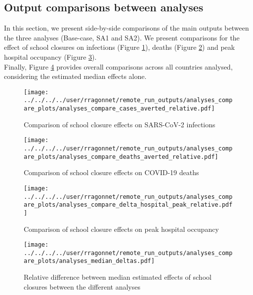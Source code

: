 \subsection{Output comparisons between analyses}
In this section, we present side-by-side comparisons of the main outputs between the three analyses (Base-case, SA1 and SA2). 
We present comparisons for the effect of school closures on infections (Figure \ref{fig:compare_infections}), deaths (Figure \ref{fig:compare_deaths}) and peak hospital occupancy (Figure \ref{fig:compare_hosp}).\\
Finally, Figure \ref{fig:compare_median} provides overall comparisons across all countries analysed, considering the estimated median effects alone.

\begin{figure}[!ht]
    \begin{center}
    \texttt{[image: ../../../../user/rragonnet/remote\_run\_outputs/analyses\_compare\_plots/analyses\_compare\_cases\_averted\_relative.pdf]}
    \end{center}
    \caption{Comparison of school closure effects on SARS-CoV-2 infections} 
    \label{fig:compare_infections}
\end{figure}


\begin{figure}[!ht]
    \begin{center}
    \texttt{[image: ../../../../user/rragonnet/remote\_run\_outputs/analyses\_compare\_plots/analyses\_compare\_deaths\_averted\_relative.pdf]}
    \end{center}
    \caption{Comparison of school closure effects on COVID-19 deaths} 
    \label{fig:compare_deaths}
\end{figure}


\begin{figure}[!ht]
    \begin{center}
    \texttt{[image: ../../../../user/rragonnet/remote\_run\_outputs/analyses\_compare\_plots/analyses\_compare\_delta\_hospital\_peak\_relative.pdf]}
    \end{center}
    \caption{Comparison of school closure effects on peak hospital occupancy} 
    \label{fig:compare_hosp}
\end{figure}


\begin{figure}[!ht]
    \begin{center}
    \texttt{[image: ../../../../user/rragonnet/remote\_run\_outputs/analyses\_compare\_plots/analyses\_median\_deltas.pdf]}
    \end{center}
    \caption{Relative difference between median estimated effects of school closures between the different analyses} 
    \label{fig:compare_median}
\end{figure}






